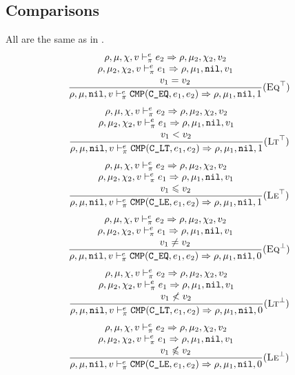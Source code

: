 \subsection{Comparisons}
All are the same as in \Cmm.
\[\dfrac{\begin{array}{c}
    \rho,\mu,\chi,v \vdash_\pi^e e_2\Rightarrow \rho,\mu_2,\chi_2,v_2 \\
    \rho,\mu_2,\chi_2,v \vdash_\pi^e e_1\Rightarrow \rho,\mu_1,\texttt{nil},v_1 \\
    \qquad v_1 = v_2
\end{array}}{\rho,\mu,\texttt{nil},v \vdash_\pi^e \texttt{CMP}(\texttt{C\_EQ}, e_1, e_2) \Rightarrow \rho,\mu_1,\texttt{nil},1}(\textsc{Eq}^\top)\]
\[\dfrac{\begin{array}{c}
    \rho,\mu,\chi,v \vdash_\pi^e e_2\Rightarrow \rho,\mu_2,\chi_2,v_2 \\
    \rho,\mu_2,\chi_2,v \vdash_\pi^e e_1\Rightarrow \rho,\mu_1,\texttt{nil},v_1 \\
    \qquad v_1 < v_2
\end{array}}{\rho,\mu,\texttt{nil},v \vdash_\pi^e \texttt{CMP}(\texttt{C\_LT}, e_1, e_2) \Rightarrow \rho,\mu_1,\texttt{nil},1}(\textsc{Lt}^\top)\]
\[\dfrac{\begin{array}{c}
    \rho,\mu,\chi,v \vdash_\pi^e e_2\Rightarrow \rho,\mu_2,\chi_2,v_2 \\
    \rho,\mu_2,\chi_2,v \vdash_\pi^e e_1\Rightarrow \rho,\mu_1,\texttt{nil},v_1 \\
    \qquad v_1 \leqslant v_2
\end{array}}{\rho,\mu,\texttt{nil},v \vdash_\pi^e \texttt{CMP}(\texttt{C\_LE}, e_1, e_2) \Rightarrow \rho,\mu_1,\texttt{nil},1}(\textsc{Le}^\top)\]
\[\dfrac{\begin{array}{c}
    \rho,\mu,\chi,v \vdash_\pi^e e_2\Rightarrow \rho,\mu_2,\chi_2,v_2 \\
    \rho,\mu_2,\chi_2,v \vdash_\pi^e e_1\Rightarrow \rho,\mu_1,\texttt{nil},v_1 \\
    \qquad v_1 \ne v_2
\end{array}}{\rho,\mu,\texttt{nil},v \vdash_\pi^e \texttt{CMP}(\texttt{C\_EQ}, e_1, e_2) \Rightarrow \rho,\mu_1,\texttt{nil},0}(\textsc{Eq}^\bot)\]
\[\dfrac{\begin{array}{c}
    \rho,\mu,\chi,v \vdash_\pi^e e_2\Rightarrow \rho,\mu_2,\chi_2,v_2 \\
    \rho,\mu_2,\chi_2,v \vdash_\pi^e e_1\Rightarrow \rho,\mu_1,\texttt{nil},v_1 \\
    \qquad v_1 \not< v_2
\end{array}}{\rho,\mu,\texttt{nil},v \vdash_\pi^e \texttt{CMP}(\texttt{C\_LT}, e_1, e_2) \Rightarrow \rho,\mu_1,\texttt{nil},0}(\textsc{Lt}^\bot)\]
\[\dfrac{\begin{array}{c}
    \rho,\mu,\chi,v \vdash_\pi^e e_2\Rightarrow \rho,\mu_2,\chi_2,v_2 \\
    \rho,\mu_2,\chi_2,v \vdash_\pi^e e_1\Rightarrow \rho,\mu_1,\texttt{nil},v_1 \\
    \qquad v_1 \not\leqslant v_2
\end{array}}{\rho,\mu,\texttt{nil},v \vdash_\pi^e \texttt{CMP}(\texttt{C\_LE}, e_1, e_2) \Rightarrow \rho,\mu_1,\texttt{nil},0}(\textsc{Le}^\bot)\]

